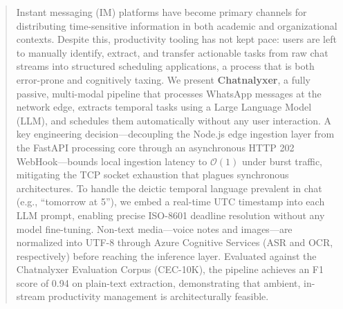 \begin{abstract}
Instant messaging (IM) platforms have become primary channels for distributing time-sensitive information in both academic and organizational contexts. Despite this, productivity tooling has not kept pace: users are left to manually identify, extract, and transfer actionable tasks from raw chat streams into structured scheduling applications, a process that is both error-prone and cognitively taxing. We present \textbf{Chatnalyxer}, a fully passive, multi-modal pipeline that processes WhatsApp messages at the network edge, extracts temporal tasks using a Large Language Model (LLM), and schedules them automatically without any user interaction. A key engineering decision—decoupling the Node.js edge ingestion layer from the FastAPI processing core through an asynchronous HTTP 202 WebHook—bounds local ingestion latency to $\mathcal{O}(1)$ under burst traffic, mitigating the TCP socket exhaustion that plagues synchronous architectures. To handle the deictic temporal language prevalent in chat (e.g., ``tomorrow at 5''), we embed a real-time UTC timestamp into each LLM prompt, enabling precise ISO-8601 deadline resolution without any model fine-tuning. Non-text media—voice notes and images—are normalized into UTF-8 through Azure Cognitive Services (ASR and OCR, respectively) before reaching the inference layer. Evaluated against the Chatnalyxer Evaluation Corpus (CEC-10K), the pipeline achieves an F1 score of 0.94 on plain-text extraction, demonstrating that ambient, in-stream productivity management is architecturally feasible.
\end{abstract}

